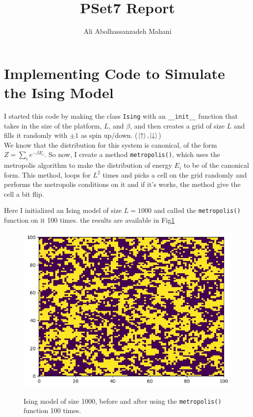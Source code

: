 \documentclass[12pt, a4paper]{article}
\title{PSet7 Report}
\author{Ali Abolhassanzadeh Mahani}
\begin{document}
	\maketitle
	\section{Implementing Code to Simulate the Ising Model}
	I started this code by making the class \texttt{Ising} with an \texttt{\_\_init\_\_} function that 
	takes in the size of the platform, $L$, and $\beta$, and then creates a grid of size $L$ and fills it
	randomly with $\pm1$ as spin up/down. ($\ket{\uparrow}, \ket{\downarrow}$)\\
	
	We know that the distribution for this system is canonical, of the form
	$Z = \sum_{i}^{} e^{-\beta E_i}$. So now, I create a method \texttt{metropolis()}, which uses the metropolis algorithm to make the distribution of energy $E_i$ to be of the canonical form.
	This method, loops for $L^2$ times and picks a cell on the grid randomly and performs the metropolis conditions on it and if it's works, the method give the cell a bit flip.
	
	Here I initialized an Ising model of size $L = 1000$ and called the \texttt{metropolis()} 
	function on it 100 times. the results are available in Fig\ref{fig:ising_grid}
	\begin{figure}
		\centering
		\includegraphics[width=0.8\linewidth]{../ising.jpg}
		\label{fig:ising_grid}
		\caption{Ising model of size 1000, before and after using the \texttt{metropolis()} function 100 times.}
	\end{figure}
	
\end{document}
